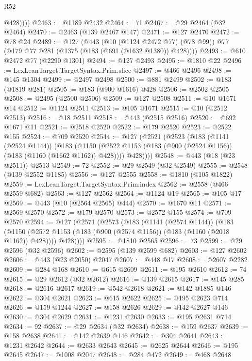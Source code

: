 \begin{lexlean}{R52}
\begin{coremodule}
{{{{{{{{{{{{{{{{{{{{{{{{{{{{{{{{{{{{{{{{{{{{{{{{{{{{{{{{{{{{{{{{{{{{{{{{{{{{{{{{{{{{{{{{{{{{{{{{{{{{{{{{{{{{{{{{{{{{{{{{{{{{{{{{{{{{{{{{{{{{{{{{{{{{{{{{{{{{{{{{{{{{{{{{{{{{{{{{{{{{{{{{{{{{{{{{{{{{{{            @428))))
@2463 := @1189 @2432
@2464 := 71
@2467 := @29 @2464 (@32 @2464)
@2470 := @2463 (@139 @2467 @147)
@2471 := @127 @2470
@2472 := @78 @24
@2489 := @127
    (@443
      (@10 (@1124 @2472 @77) (@78 @99))
      @77
      (@179 @77 @281 (@1375 (@183 (@691 (@1632 @1380)) @428))))
@2493 := @610 @2472 @77 (@2290 @1301)
@2494 := @127 @2493
@2495 := @1810 @22
@2496 := LexLeanTarget.TargetSyntax.Prim.slice
@2497 := @466 @2496
@2498 := @145 @1304
@2499 := @2497 @2498
@2500 := @881 @2499
@2502 := @183 (@1819 @281)
@2505 := @183 (@900 @1616) @428
@2506 := @2502 @2505
@2508 := @2495 (@2500 @2506)
@2509 := @127 @2508
@2511 := @10 @1671 @14
@2512 := @1124 @2511
@2513 := @105 @1671
@2515 := @10 (@2512 @2513)
@2516 := @18 @2511
@2518 := @443 (@2515 @2516)
@2520 := @692 @1671 @11
@2521 := @2518 @2520
@2522 := @179 @2520
@2523 := @2522 @155
@2524 := @709 @2520
@2544 := @127
    (@2521
      (@2523
        (@183
          (@1141 (@2524 @1144))
          (@183
            (@1150 (@2522 @1153 (@183 (@900 (@2524 @1156)) (@183 (@1160 (@1662 @1162)) @428))))
            @428))))
@2548 := @443 (@18 (@23 @2511)) @2513
@2549 := 72
@2552 := @29 @2549 (@32 @2549)
@2555 := @2548 (@139 @2552 @1185)
@2556 := @127 @2555
@2558 := @1810 (@105 @1822)
@2559 := LexLeanTarget.TargetSyntax.Prim.index
@2562 := @2558 (@466 @2559 @682)
@2563 := @127 @2562
@2564 := @1124 @19
@2565 := @105 @17
@2569 := @443 (@10 (@2564 @2565) @444)
@2570 := @1670 @11
@2571 := @2569 @2570
@2572 := @179 @2570
@2573 := @2572 @155
@2574 := @709 @2570
@2594 := @127
    (@2571
      (@2573
        (@183
          (@1141 (@2574 @1144))
          (@183
            (@1150 (@2572 @1153 (@183 (@900 (@2574 @1156)) (@183 (@1160 (@2018 @1162)) @428))))
            @428))))
@2595 := @1810 @2565
@2596 := 73
@2599 := @29 @2596 (@32 @2596)
@2602 := @2595 (@139 @2599 @682)
@2603 := @127 @2602
@2606 := @443 (@23 @2050) @2047
@2607 := @448 @17
@2608 := @2607 @2282
@2609 := @284 @168
@2610 := @615 @2609
@2611 := @195 @2610
@2612 := 74
@2615 := @29 @2612 (@32 @2612)
@2616 := @139 @2615
@2617 := @145 @285
@2618 := @2616 @2617
@2619 := @542 @2618
@2621 := @142 @1885 @146
@2622 := @304 @2621
@2623 := @615 @2622
@2625 := @195 @2623 @714
@2626 := @159 @1244
@2627 := @158 @2626
@2629 := @142 @2627 @146
@2630 := @304 @2629
@2631 := @1231 @2630
@2633 := @195 @2631 @714
@2634 := 92
@2637 := @29 @2634 (@32 @2634)
@2638 := @159 @2637
@2639 := @158 @2638
@2641 := @142 @2639 @146
@2642 := @304 @2641
@2643 := @1231 @2642
@2644 := @2633 @2643
@2645 := @2625 @2644
@2646 := @195 @2645
@2647 := @1008 @2047
@2648 := @284 @472
@2649 := @468 @2648
}}}}}}}}}}}}}}}}}}}}}}}}}}}}}}}}}}}}}}}}}}}}}}}}}}}}}}}}}}}}}}}}}}}}}}}}}}}}}}}}}}}}}}}}}}}}}}}}}}}}}}}}}}}}}}}}}}}}}}}}}}}}}}}}}}}}}}}}}}}}}}}}}}}}}}}}}}}}}}}}}}}}}}}}}}}}}}}}}}}}}}}}}}}}}}}}}}}}}}
\end{coremodule}
\end{lexlean}
